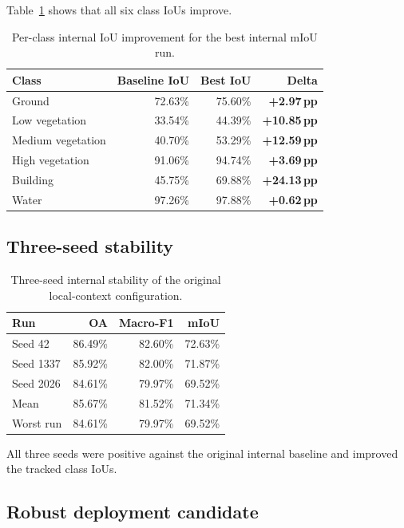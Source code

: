 \documentclass[11pt,a4paper]{article}
\newcommand{\pp}{\,pp}
\newcommand{\good}[1]{\textcolor{evogreen}{\textbf{#1}}}
\begin{document}
Table~\ref{tab:internal-class-old} shows that all six class IoUs improve.

\begin{table}[ht]
\centering
\caption{Per-class internal IoU improvement for the best internal mIoU run.}
\label{tab:internal-class-old}
\begin{tabular}{lrrr}
\toprule
Class & Baseline IoU & Best IoU & Delta \\
\midrule
Ground & 72.63\% & 75.60\% & \good{+2.97\pp} \\
Low vegetation & 33.54\% & 44.39\% & \good{+10.85\pp} \\
Medium vegetation & 40.70\% & 53.29\% & \good{+12.59\pp} \\
High vegetation & 91.06\% & 94.74\% & \good{+3.69\pp} \\
Building & 45.75\% & 69.88\% & \good{+24.13\pp} \\
Water & 97.26\% & 97.88\% & \good{+0.62\pp} \\
\bottomrule
\end{tabular}
\end{table}

\subsection{Three-seed stability}

\begin{table}[ht]
\centering
\caption{Three-seed internal stability of the original local-context configuration.}
\label{tab:seeds}
\begin{tabular}{lrrr}
\toprule
Run & OA & Macro-F1 & mIoU \\
\midrule
Seed 42 & 86.49\% & 82.60\% & 72.63\% \\
Seed 1337 & 85.92\% & 82.00\% & 71.87\% \\
Seed 2026 & 84.61\% & 79.97\% & 69.52\% \\
\midrule
Mean & 85.67\% & 81.52\% & 71.34\% \\
Worst run & 84.61\% & 79.97\% & 69.52\% \\
\bottomrule
\end{tabular}
\end{table}

All three seeds were positive against the original internal baseline and improved the tracked class IoUs.

\subsection{Robust deployment candidate}
\end{document}
